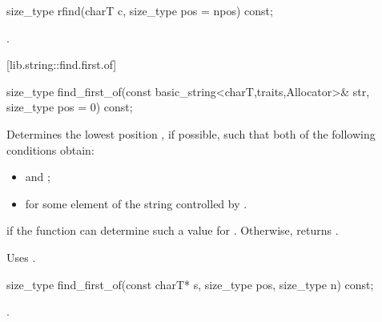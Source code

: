 %
%
\begin{itemdecl}
size_type rfind(charT c, size_type pos = npos) const;
\end{itemdecl}

\begin{itemdescr}
\pnum
\returns
{}.
\end{itemdescr}

[lib.string::find.first.of]{}

%
%
\begin{itemdecl}
size_type
  find_first_of(const basic_string<charT,traits,Allocator>& str,
                size_type pos = 0) const;
\end{itemdecl}

\begin{itemdescr}
\pnum
\effects
Determines the lowest position , if possible, such that both of
the following conditions obtain:

\begin{itemize}
\item
{}
and
;
\item
{}%
for some element  of the string controlled by .
\end{itemize}

\pnum
\returns
{} if the function can determine such a value for .
Otherwise, returns
.

\pnum
\notes
Uses
.
\end{itemdescr}

%
%
\begin{itemdecl}
size_type
  find_first_of(const charT* s, size_type pos, size_type n) const;
\end{itemdecl}

\begin{itemdescr}
\pnum
\returns
{}.
\end{itemdescr}

